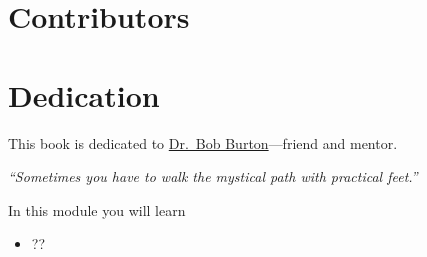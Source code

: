 \documentclass{workbook}
\begin{document}







\hypersetup{bookmarksdepth=3}

\pagestyle{empty}



\newpage

\begin{bookonly}
	\clearpage
	\hbox{}
	\newpage
	
	\section*{Contributors}
	
	\section*{Dedication}
	\begin{center}
		This book is dedicated to
		\href{https://www.gazettetimes.com/news/local/obituaries/dr-robert-main-burton/article_9c087f07-c005-515a-bb3f-2c9c6a6b7332.html}{\color{blue}Dr.~Bob Burton}---friend and mentor.

		\emph{\large ``Sometimes you have to walk the mystical path with practical feet.''}
	\end{center}
	\newpage
	\mbox{}
	{
		\pagestyle{empty}
		\setcounter{tocdepth}{1}
		\tableofcontents
		\thispagestyle{empty}
	}
	\newpage
	\mbox{}
	\newpage
\end{bookonly}

\setcounter{page}{1}
\pagestyle{siefken}



\begin{module}\label{module1}

	In this module you will learn
	\begin{itemize}
		\item ??
	\end{itemize}

	
\end{module}
\end{document}
